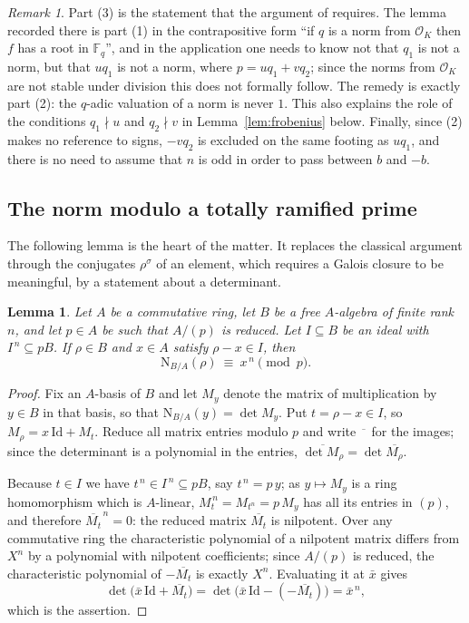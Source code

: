 \documentclass[11pt,reqno]{amsart}
\theoremstyle{plain}
\newtheorem{lemma}[theorem]{Lemma}
\theoremstyle{definition}
\theoremstyle{remark}
\newtheorem{remark}[theorem]{Remark}
\newcommand{\F}{\mathbb{F}}
\newcommand{\OK}{\mathcal{O}_K}
\newcommand{\N}{\mathrm{N}}
\begin{document}
\begin{remark}\label{rem:lemma23}
Part (3) is the statement that the argument of \cite{HMT} requires. The lemma recorded there is
part (1) in the contrapositive form ``if $q$ is a norm from $\OK$ then $f$ has a root in $\F_q$'',
and in the application one needs to know not that $q_1$ is not a norm, but that $u q_1$ is not a
norm, where $p=uq_1+vq_2$; since the norms from $\OK$ are not stable under division this does not
formally follow. The remedy is exactly part (2): the $q$-adic valuation of a norm is never $1$.
This also explains the role of the conditions $q_1\nmid u$ and $q_2\nmid v$ in
Lemma~\ref{lem:frobenius} below. Finally, since (2) makes no reference to signs, $-vq_2$ is
excluded on the same footing as $uq_1$, and there is no need to assume that $n$ is odd in order to
pass between $b$ and $-b$.
\end{remark}

\subsection{The norm modulo a totally ramified prime}

The following lemma is the heart of the matter. It replaces the classical argument through the
conjugates $\rho^\sigma$ of an element, which requires a Galois closure to be meaningful, by a
statement about a determinant.

\begin{lemma}\label{lem:norm-power}
Let $A$ be a commutative ring, let $B$ be a free $A$-algebra of finite rank $n$, and let $p\in A$
be such that $A/(p)$ is reduced. Let $I\subseteq B$ be an ideal with $I^{\,n}\subseteq pB$. If
$\rho\in B$ and $x\in A$ satisfy $\rho-x\in I$, then
\[
  \N_{B/A}(\rho)\ \equiv\ x^{\,n} \pmod{p}.
\]
\end{lemma}

\begin{proof}
Fix an $A$-basis of $B$ and let $M_y$ denote the matrix of multiplication by $y\in B$ in that
basis, so that $\N_{B/A}(y)=\det M_y$. Put $t=\rho-x\in I$, so $M_\rho=x\,\mathrm{Id}+M_t$.
Reduce all matrix entries modulo $p$ and write $\overline{\phantom{x}}$ for the images; since the
determinant is a polynomial in the entries, $\overline{\det M_\rho}=\det\overline{M_\rho}$.

Because $t\in I$ we have $t^{\,n}\in I^{\,n}\subseteq pB$, say $t^{\,n}=p\,y$; as
$y\mapsto M_y$ is a ring homomorphism which is $A$-linear, $M_t^{\,n}=M_{t^n}=p\,M_y$ has all its
entries in $(p)$, and therefore $\overline{M_t}^{\,n}=0$: the reduced matrix $\overline{M_t}$ is
nilpotent. Over any commutative ring the characteristic polynomial of a nilpotent matrix differs
from $X^n$ by a polynomial with nilpotent coefficients; since $A/(p)$ is reduced, the
characteristic polynomial of $-\overline{M_t}$ is exactly $X^n$. Evaluating it at $\bar x$ gives
\[
  \det\bigl(\bar x\,\mathrm{Id}+\overline{M_t}\bigr)
  =\det\bigl(\bar x\,\mathrm{Id}-(-\overline{M_t})\bigr)=\bar x^{\,n},
\]
which is the assertion.
\end{proof}
\end{document}

